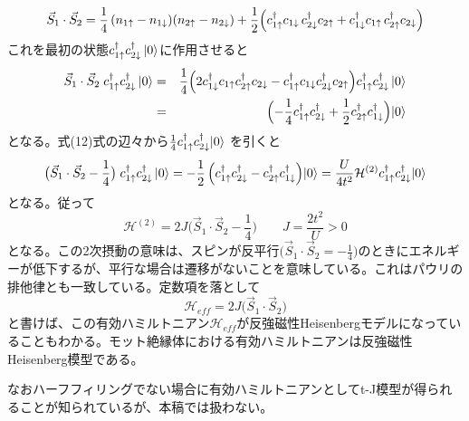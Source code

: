 \documentclass[12pt]{jarticle}
\begin{document}
\begin{equation}
  \vec S_1 \cdot \vec S_2
= \frac14\,(n_{1\uparrow}-n_{1\downarrow})(n_{2\uparrow}-n_{2\downarrow})
+ \frac12\Bigl(
  c_{1\uparrow}^\dagger c_{1\downarrow}\,c_{2\downarrow}^\dagger c_{2\uparrow}
+ c_{1\downarrow}^\dagger c_{1\uparrow}\,c_{2\uparrow}^\dagger c_{2\downarrow}
\Bigr)
\end{equation}
これを最初の状態$c_{1\uparrow}^\dagger c_{2\downarrow}^\dagger\ket{0}$に作用させると
\begin{eqnarray}
  \vec S_1\cdot\vec S_2 \;c_{1\uparrow}^\dagger c_{2\downarrow}^\dagger\ket{0}
&=& \frac{1}{4}\Bigl(2c_{1\downarrow}^\dagger c_{1\uparrow}c_{2\uparrow}^\dagger c_{2\downarrow} - c_{1\uparrow}^\dagger c_{1\downarrow}c_{2\downarrow}^\dagger c_{2\uparrow}\Bigr)c_{1\uparrow}^\dagger c_{2\downarrow}^\dagger\ket{0} \notag\\
&=&\Bigl(-\frac{1}{4}c_{1\uparrow}^\dagger c_{2\downarrow}^\dagger+\frac{1}{2}c_{2\uparrow}^\dagger c_{1\downarrow}^\dagger\Bigr)\!\ket{0}
\end{eqnarray}
となる。式(12)式の辺々から$\frac{1}{4}c_{1\uparrow}^\dagger c_{2\downarrow}^\dagger\!\ket{0}$
を引くと
\begin{equation}
  \bigl(\vec S_1\cdot\vec S_2 - \frac{1}{4}\bigr) \;c_{1\uparrow}^\dagger c_{2\downarrow}^\dagger\ket{0} = -\frac{1}{2}\,
\Bigl(c_{1\uparrow}^\dagger c_{2\downarrow}^\dagger-c_{2\uparrow}^\dagger c_{1\downarrow}^\dagger\Bigr)\!\ket{0} = \frac{U}{4t^2}\mathcal{H}^{(2)}
c_{1\uparrow}^\dagger c_{2\downarrow}^\dagger\!\ket{0}
\end{equation}
となる。従って
\begin{equation}
  \mathcal{H}^{(2)} = 2J\bigl(\vec S_1\cdot\vec S_2 - \frac{1}{4}\bigr) \qquad J = \frac{2t^2}{U}>0
\end{equation}
となる。この2次摂動の意味は、スピンが反平行$\bigl(\vec S_1\cdot\vec S_2 = -\frac{1}{4}\bigr)$のときにエネルギーが低下するが、平行な場合は遷移がないことを意味している。これはパウリの排他律とも一致している。定数項を落として
\begin{equation}
  \mathcal{H}_{eff} = 2J\bigl(\vec S_1\cdot\vec S_2 \bigr)
\end{equation}
と書けば、この有効ハミルトニアン$\mathcal{H}_{eff}$が反強磁性Heisenbergモデルになっていることもわかる。モット絶縁体における有効ハミルトニアンは反強磁性Heisenberg模型である。

なおハーフフィリングでない場合に有効ハミルトニアンとしてt-J模型が得られることが知られているが、本稿では扱わない。
\end{document}

